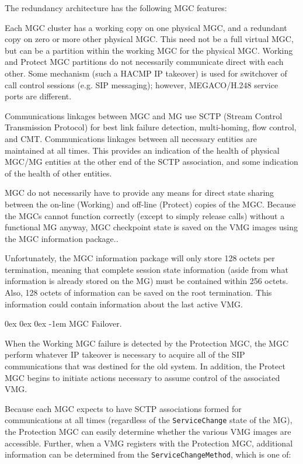 \documentclass[letterpaper,final,notitlepage,twocolumn,10pt,twoside]{article}
\makeatletter
\let\normalsize = \small
\let\small = \footnotesize
\let\footnotesize = \scriptsize
\let\scriptsize = \tiny
\renewcommand\subparagraph{\@startsection{subparagraph}{5}{\parindent}%
                                       {0ex \@plus 0ex \@minus 0ex}%
                                       {-1em}%
                                      {\normalfont\normalsize\bfseries\slshape}}
\makeatother
\begin{document}
The redundancy architecture has the following MGC features:

Each MGC cluster has a working copy on one physical MGC, and a redundant copy
on zero or more other physical MGC.  This need not be a full virtual MGC, but
can be a partition within the working MGC for the physical MGC.
Working and Protect MGC partitions do not necessarily communicate direct with
each other.  Some mechanism (such a HACMP IP takeover) is used for switchover
of call control sessions (e.g. SIP messaging); however, MEGACO/H.248 service
ports are different.

Communications linkages between MGC and MG use SCTP (Stream Control
Transmission Protocol) for best link failure detection, multi-homing, flow
control, and CMT.  Communications linkages between all necessary entities are
maintained at all times.  This provides an indication of the health of
physical MGC/MG entities at the other end of the SCTP association, and some
indication of the health of other entities.

MGC do not necessarily have to provide any means for direct state sharing
between the on-line (Working) and off-line (Protect) copies of the MGC.
Because the MGCs cannot function correctly (except to simply release calls)
without a functional MG anyway, MGC checkpoint state is saved on the VMG
images using the MGC information package.\cite[]{H24845}.
      
Unfortunately, the MGC information package will only store 128 octets per
termination, meaning that complete session state information (aside from what
information is already stored on the MG) must be contained within 256 octets.
Also, 128 octets of information can be saved on the root termination.  This
information could contain information about the last active VMG.

\subparagraph{MGC Failover.}

When the Working MGC failure is detected by the Protection MGC, the MGC
perform whatever IP takeover is necessary to acquire all of the SIP
communications that was destined for the old system.  In addition, the Protect
MGC begins to initiate actions necessary to assume control of the associated
VMG.

Because each MGC expects to have SCTP associations formed for communications
at all times (regardless of the {\tt ServiceChange} state of the MG), the
Protection MGC can easily determine whether the various VMG images are
accessible.  Further, when a VMG registers with the Protection MGC, additional
information can be determined from the {\tt ServiceChangeMethod}, which is one
of:
\end{document}
